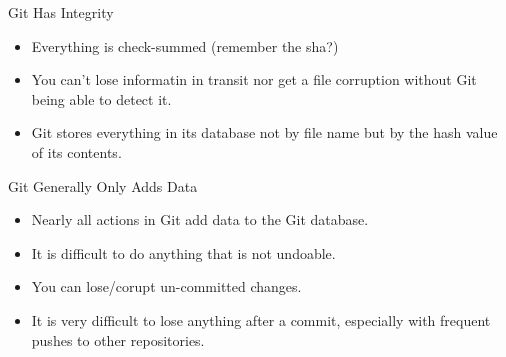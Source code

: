 \begin{frame}[t]{Git Has Integrity}
  \begin{itemize}
    \item Everything is check-summed (remember the sha?)
    \item You can't lose informatin in transit nor get a file corruption without
      Git being able to detect it.
    \item Git stores everything in its database not by file name but by the hash
      value of its contents.
  \end{itemize}
\end{frame}

\begin{frame}[t]{Git Generally Only Adds Data}
  \begin{itemize}
    \item Nearly all actions in Git add data to the Git database.
    \item It is difficult to do anything that is not undoable.
    \item You can lose/corupt un-committed changes.
    \item It is very difficult to lose anything after a commit, especially with
      frequent pushes to other repositories.
  \end{itemize}
\end{frame}

